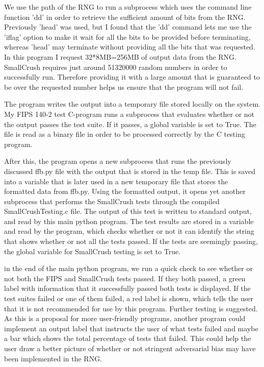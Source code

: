 \documentclass[]{final_report}
\begin{document}
\par{We use the path of the RNG to run a subprocess which uses the command line function 'dd' in order to retrieve the sufficient amount of bits from the RNG. Previously 'head' was used, but I found that the 'dd' command lets me use the 'iflag' option to make it wait for all the bits to be provided before terminating, whereas 'head' may terminate without providing all the bits that was requested. In this program I request 32*8MB=256MB of output data from the RNG. SmallCrush requires just around 51320000 random numbers in order to successfully run. Therefore providing it with a large amount that is guaranteed to be over the requested number helps us ensure that the program will not fail.}

\par{The program writes the output into a temporary file stored locally on the system. My FIPS 140-2 test C-program runs a subprocess that evaluates whether or not the output passes the test suite. If it passes, a global variable is set to True. The file is read as a binary file in order to be processed correctly by the C testing program.}

\par{After this, the program opens a new subprocess that runs the previously discussed ffb.py file with the output that is stored in the temp file. This is saved into a variable that is later used in a new temporary file that stores the formatted data from ffb.py. Using the formatted output, it opens yet another subprocess that performs the SmallCrush tests through the compiled SmallCrushTesting.c file. The output of this test is written to standard output, and read by this main python program. The test results are stored in a variable and read by the program, which checks whether or not it can identify the string that shows whether or not all the tests passed. If the tests are seemingly passing, the global variable for SmallCrush testing is set to True.}

\par{in the end of the main python program, we run a quick check to see whether or not both the FIPS and SmallCrush tests passed. If they both passed, a green label with information that it successfully passed both tests is displayed. If the test suites failed or one of them failed, a red label is shown, which tells the user that it is not recommended for use by this program. Further testing is suggested. As this is a proposal for more user-friendly programs, another program could implement an output label that instructs the user of what tests failed and maybe a bar which shows the total percentage of tests that failed. This could help the user draw a better picture of whether or not stringent adversarial bias may have been implemented in the RNG.}
\end{document}
